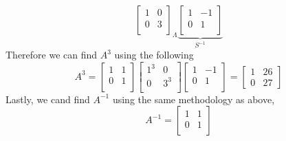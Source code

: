 \begin{enumerate}[label=\arabic*.]
\begin{mdframed}[style=MyFrame]
\begin{equation}
{                \begin{bmatrix}
                    1       &   0   \\
                    0       &   3   \\
                \end{bmatrix}
                }_{\Lambda}
                \underbrace{
                \begin{bmatrix}
                    1       &   -1  \\
                    0       &   1   \\
                \end{bmatrix}
            }_{S^{-1}}
            \end{equation}
            Therefore we can find $A^{3}$ using the following 
            \begin{equation}
                A^{3} = 
                \begin{bmatrix}
                    1       &   1   \\
                    0       &   1   \\
                \end{bmatrix}
                \begin{bmatrix}
                    1^{3}   &   0       \\
                    0       &   3^{3}   \\
                \end{bmatrix}
                \begin{bmatrix}
                    1       &   -1  \\
                    0       &   1   \\
                \end{bmatrix}
                =
                \begin{bmatrix}
                    1           &       26  \\
                    0           &       27
                \end{bmatrix}
            \end{equation}
            Lastly, we cand find $A^{-1}$ using the same methodology as
            above,
            \begin{equation}
                A^{-1} = 
                \begin{bmatrix}
                    1       &   1   \\
                    0       &   1   \\
                \end{bmatrix}

\end{equation}
\end{mdframed}
\end{enumerate}

